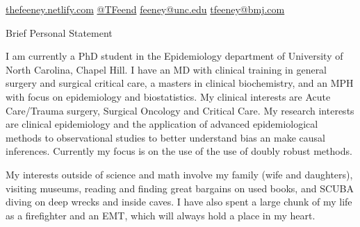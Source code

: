 \documentclass{resume} %
\begin{document}
%

\begin{center} 
 \href{https://thefeeney.netlify.com}{thefeeney.netlify.com}
 \hfill
 \href{https://twitter.com/TFeend}{@TFeend}
  \hfill
  \href{mailto:feeney@unc.edu}{feeney@unc.edu}
  \hfill
  \href{mailto:tfeeney@bmj.com}{tfeeney@bmj.com}
  \hfill
  \end{center}

\begin{rSection}{Brief Personal Statement}


{I am currently a PhD student in the Epidemiology department of University of North Carolina, Chapel Hill.
I have an MD with clinical training in general surgery and surgical critical care, a masters in clinical biochemistry, and an MPH
 with focus on epidemiology and biostatistics. My clinical interests are Acute Care/Trauma surgery, Surgical Oncology and
  Critical Care. My research interests are clinical epidemiology and the application of advanced 
  epidemiological methods to observational studies to better understand bias an make causal inferences. Currently my focus is on the use of the
  use of doubly robust methods.

My interests outside of science and math involve my family (wife and daughters), visiting museums, reading 
and finding great bargains on used books, and SCUBA diving on deep wrecks and inside caves. I have also spent
 a large chunk of my life as a firefighter and an EMT, which will always hold a place in my heart.}

\end{rSection}
\end{document}
